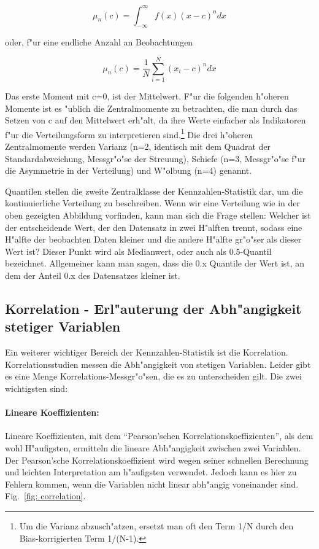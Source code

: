 \documentclass[a4paper,twoside]{tufte-book}\usepackage[]{graphicx}\usepackage[]{color}
\begin{document}
\begin{equation}
\mu_n(c) = \int_{-\infty}^{\infty} f(x) (x - c)^n dx
\end{equation}

oder, f"ur eine endliche Anzahl an Beobachtungen 

\begin{equation}
\mu_n(c) = \frac{1}{N}\sum_{i=1}^N (x_i - c)^n dx
\end{equation}

Das erste Moment mit c=0, ist der Mittelwert. F"ur die folgenden h"oheren Momente ist es "ublich die Zentralmomente zu betrachten, die man durch das Setzen von c auf den Mittelwert erh"alt, da ihre Werte einfacher als Indikatoren f"ur die Verteilungsform zu interpretieren sind.\footnote{Um die Varianz abzusch"atzen, ersetzt man oft den Term 1/N durch den Bias-korrigierten Term 1/(N-1).} Die drei h"oheren Zentralmomente werden Varianz (n=2, identisch mit dem Quadrat der Standardabweichung, Messgr"o"se der Streuung), Schiefe (n=3, Messgr"o"se f"ur die Asymmetrie in der Verteilung) und W"olbung (n=4) genannt. 

Quantilen stellen die zweite Zentralklasse der Kennzahlen-Statistik dar, um die kontinuierliche Verteilung zu beschreiben. Wenn wir eine Verteilung wie in der oben gezeigten Abbildung vorfinden, kann man sich die Frage stellen: Welcher ist der entscheidende Wert, der den Datensatz in zwei H"alften trennt, sodass eine H"alfte der beobachten Daten kleiner und die andere H"alfte gr"o"ser als dieser Wert ist? Dieser Punkt wird als Medianwert, oder auch als 0.5-Quantil bezeichnet. Allgemeiner kann man sagen, dass die 0.x Quantile der Wert ist, an dem der Anteil 0.x des Datensatzes kleiner ist. 

\subsection{Korrelation - Erl"auterung der Abh"angigkeit stetiger Variablen}

Ein weiterer wichtiger Bereich der Kennzahlen-Statistik ist die Korrelation. Korrelationsstudien messen die Abh"angigkeit von stetigen Variablen. Leider gibt es eine Menge Korrelations-Messgr"o"sen, die es zu unterscheiden gilt. Die zwei wichtigsten sind:

\paragraph{Lineare Koeffizienten:}Lineare Koeffizienten, mit dem "`Pearson'schen Korrelationskoeffizienten"', als dem wohl H"aufigsten, ermitteln die lineare Abh"angigkeit zwischen zwei Variablen. Der Pearson'sche Korrelationskoeffizient wird wegen seiner schnellen Berechnung und leichten Interpretation am h"aufigsten verwendet. Jedoch kann es hier zu Fehlern kommen, wenn die Variablen nicht linear abh"angig voneinander sind. Fig.~\ref{fig: correlation}.
\end{document}
